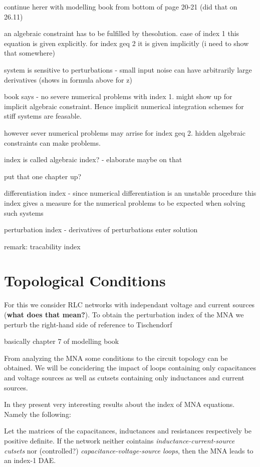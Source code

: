 continue herer with modelling book from bottom of page 20-21 (did that on 26.11)

an algebraic constraint has to be fulfilled by thesolution. case of index 1 this equation is given explicitly. for index geq 2 it is given implicitly (i need to show that somewhere) 

system is sensitive to perturbations - small input noise can have arbitrarily large derivatives (shows in formula above for z)

book says - no severe numerical problems with index 1. might show up for implicit algebraic constraint.  Hence implicit numerical integration schemes for stiff systems are feasable.

however sever numerical problems may arrise for index geq 2. hidden algebraic constraints can make problems.

index is called algebraic index? - elaborate maybe on that

put that one chapter up?

differentiation index - since numerical differentiation is an unstable procedure this index gives a measure for the numerical problems to be expected when solving such systems

perturbation index - derivatives of perturbations enter solution

remark: tracability index



\section{Topological Conditions}
For this we consider RLC networks with independant voltage and current sources (\textbf{what does that mean?}). To obtain the perturbation index of the MNA we perturb the right-hand side of  
\newline reference to Tischendorf



basically chapter 7 of modelling book

From analyzing the MNA some conditions to the circuit topology can be obtained. We will be concidering the impact of loops containing only capacitances and voltage sources as well as cutsets containing only inductances and current sources.

In \cite{Tischendorf2005Topological} they present very interesting results about the index of MNA equations. Namely the following:


\begin{theorem} \cite{Tischendorf2004Topological}
	Let the matrices of the capacitances, inductances and resistances respectively be positive definite. If the network neither cointains \emph{inductance-current-source cutsets} nor (controlled?) \emph{capacitance-voltage-source loops}, then the MNA leads to an index-1 DAE.
\end{theorem}

